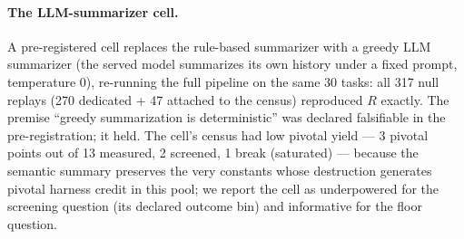 \documentclass{article}
\theoremstyle{remark}
\begin{document}
\paragraph{The LLM-summarizer cell.} A pre-registered cell replaces the
rule-based summarizer with a greedy LLM summarizer (the served model
summarizes its own history under a fixed prompt, temperature $0$),
re-running the full pipeline on the same 30 tasks: all 317 null replays
(270 dedicated + 47 attached to the census) reproduced $R$ exactly. The
premise ``greedy summarization is deterministic'' was declared falsifiable
in the pre-registration; it held. The cell's census had low pivotal yield
--- 3 pivotal points out of 13 measured, 2 screened, 1 break (saturated)
--- because the semantic summary preserves the very constants whose
destruction generates pivotal harness credit in this pool; we report the
cell as underpowered for the screening question (its declared outcome bin)
and informative for the floor question.
\end{document}
